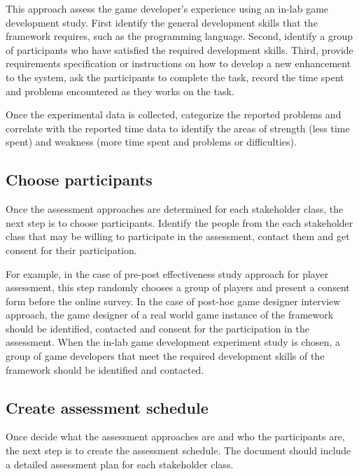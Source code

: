 \label{In-lab game development study}

This approach assess the game developer's experience using an in-lab game development study.  
First identify the general development skills that the framework requires, such as the programming language. 
Second, identify a group of participants who have satisfied the required development skills. Third, provide 
requirements specification or instructions on how to develop a new enhancement to the system, ask the 
participants to complete the task, record the time spent and problems encountered as they works on the task.

Once the experimental data is collected, categorize the reported problems and correlate with the reported time data 
to identify the areas of strength (less time spent) and weakness (more time spent and problems or difficulties). 

\subsection {Choose participants}

Once the assessment approaches are determined for each stakeholder class, the next step is to choose participants. 
Identify the  people from the each stakeholder class that may be willing to participate in the assessment, contact them 
and get consent for their participation. 

For example, in the case of pre-post effectiveness study approach for player assessment, this step randomly chooses a 
group of players and present a consent form before the online survey.  In the case of post-hoc game designer interview 
approach, the game designer of a real world game instance of the framework should be identified, contacted and consent 
for the participation in the assessment. When the in-lab game development experiment study is chosen, a group of game 
developers that meet the required development skills of the framework should be identified and contacted.

\subsection{Create assessment schedule}

Once decide what the assessment approaches are and who the participants are, the next step is to create the assessment 
schedule. The document should include a detailed assessment plan for 
each stakeholder class. 

